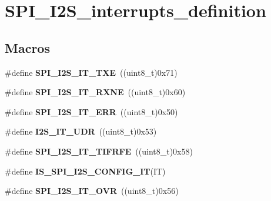 \hypertarget{group___s_p_i___i2_s__interrupts__definition}{\section{S\-P\-I\-\_\-\-I2\-S\-\_\-interrupts\-\_\-definition}
\label{group___s_p_i___i2_s__interrupts__definition}
}
\subsection*{Macros}
\begin{DoxyCompactItemize}
\item 
\hypertarget{group___s_p_i___i2_s__interrupts__definition_ga0f192977fdb12c40d35672b8ae074724}{\#define {\bfseries S\-P\-I\-\_\-\-I2\-S\-\_\-\-I\-T\-\_\-\-T\-X\-E}~((uint8\-\_\-t)0x71)}\label{group___s_p_i___i2_s__interrupts__definition_ga0f192977fdb12c40d35672b8ae074724}

\item 
\hypertarget{group___s_p_i___i2_s__interrupts__definition_gae46dd53cd2e4ad8b8a7836d3dcec57ea}{\#define {\bfseries S\-P\-I\-\_\-\-I2\-S\-\_\-\-I\-T\-\_\-\-R\-X\-N\-E}~((uint8\-\_\-t)0x60)}\label{group___s_p_i___i2_s__interrupts__definition_gae46dd53cd2e4ad8b8a7836d3dcec57ea}

\item 
\hypertarget{group___s_p_i___i2_s__interrupts__definition_ga1d9d4916bf7ae315f23a54ecfbcd9157}{\#define {\bfseries S\-P\-I\-\_\-\-I2\-S\-\_\-\-I\-T\-\_\-\-E\-R\-R}~((uint8\-\_\-t)0x50)}\label{group___s_p_i___i2_s__interrupts__definition_ga1d9d4916bf7ae315f23a54ecfbcd9157}

\item 
\hypertarget{group___s_p_i___i2_s__interrupts__definition_ga54aba7dc06f97fb4839de5f42bd5a47d}{\#define {\bfseries I2\-S\-\_\-\-I\-T\-\_\-\-U\-D\-R}~((uint8\-\_\-t)0x53)}\label{group___s_p_i___i2_s__interrupts__definition_ga54aba7dc06f97fb4839de5f42bd5a47d}

\item 
\hypertarget{group___s_p_i___i2_s__interrupts__definition_gab147fb8ba6913106e06ac80dcf4005a4}{\#define {\bfseries S\-P\-I\-\_\-\-I2\-S\-\_\-\-I\-T\-\_\-\-T\-I\-F\-R\-F\-E}~((uint8\-\_\-t)0x58)}\label{group___s_p_i___i2_s__interrupts__definition_gab147fb8ba6913106e06ac80dcf4005a4}

\item 
\#define {\bfseries I\-S\-\_\-\-S\-P\-I\-\_\-\-I2\-S\-\_\-\-C\-O\-N\-F\-I\-G\-\_\-\-I\-T}(I\-T)
\item 
\hypertarget{group___s_p_i___i2_s__interrupts__definition_ga279c30176e8ff7e2ec299774a2e88f45}{\#define {\bfseries S\-P\-I\-\_\-\-I2\-S\-\_\-\-I\-T\-\_\-\-O\-V\-R}~((uint8\-\_\-t)0x56)}\label{group___s_p_i___i2_s__interrupts__definition_ga279c30176e8ff7e2ec299774a2e88f45}


\end{DoxyCompactItemize}
